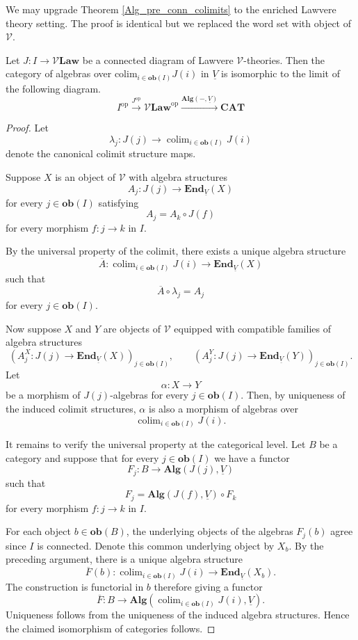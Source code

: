 \documentclass{tac}
\begin{document}
We may upgrade Theorem \ref{Alg_pre_conn_colimits} to the enriched Lawvere theory setting. The proof is identical but we replaced the word set with object of $\mathcal{V}$.

\begin{theorem}
Let $J:I\to\mathcal{V}\mathbf{Law}$ be a connected diagram of Lawvere $\mathcal{V}$-theories. Then the category of algebras over $\text{colim}_{i\in\mathbf{ob}(I)}J(i)$ in $\underline{V}$ is isomorphic to the limit of the following diagram.
\[
I^\text{op}\xrightarrow{J^\text{op}}\mathcal{V}\mathbf{Law}^\text{op}\xrightarrow{\mathbf{Alg}(-,\underline{V})}\mathbf{CAT}
\]
\end{theorem}

\begin{proof}
Let
\[
\lambda_j:J(j)\to\operatorname{colim}_{i\in\mathbf{ob}(I)}J(i)
\]
denote the canonical colimit structure maps.

Suppose $X$ is an object of $\mathcal{V}$ with algebra structures
\[
A_j:J(j)\to\mathbf{End}_{\underline{V}}(X)
\]
for every $j\in\mathbf{ob}(I)$ satisfying
\[
A_j=A_k\circ J(f)
\]
for every morphism $f:j\to k$ in $I$.

By the universal property of the colimit, there exists a unique algebra structure
\[
\overline{A}:
\operatorname{colim}_{i\in\mathbf{ob}(I)}J(i)
\to\mathbf{End}_{\underline{V}}(X)
\]
such that
\[
\overline{A}\circ\lambda_j=A_j
\]
for every $j\in\mathbf{ob}(I)$.

Now suppose $X$ and $Y$ are objects of $\mathcal{V}$ equipped with compatible families of algebra structures
\[
(A^X_j:J(j)\to\mathbf{End}_{\underline{V}}(X))_{j\in\mathbf{ob}(I)},
\qquad
(A^Y_j:J(j)\to\mathbf{End}_{\underline{V}}(Y))_{j\in\mathbf{ob}(I)}.
\]
Let
\[
\alpha:X\to Y
\]
be a morphism of $J(j)$-algebras for every $j\in\mathbf{ob}(I)$. Then, by uniqueness of the induced colimit structures, $\alpha$ is also a morphism of algebras over
\[
\operatorname{colim}_{i\in\mathbf{ob}(I)}J(i).
\]

It remains to verify the universal property at the categorical level. Let $B$ be a category and suppose that for every $j\in\mathbf{ob}(I)$ we have a functor
\[
F_j:B\to\mathbf{Alg}(J(j),\underline{V})
\]
such that
\[
F_j=\mathbf{Alg}(J(f),\underline{V})\circ F_k
\]
for every morphism $f:j\to k$ in $I$.

For each object $b\in\mathbf{ob}(B)$, the underlying objects of the algebras $F_j(b)$ agree since $I$ is connected. Denote this common underlying object by $X_b$. By the preceding argument, there is a unique algebra structure
\[
\overline{F}(b):
\operatorname{colim}_{i\in\mathbf{ob}(I)}J(i)
\to\mathbf{End}_{\underline{V}}(X_b).
\]
The construction is functorial in $b$ therefore giving a functor
\[
\overline{F}:B\to
\mathbf{Alg}
\left(
\operatorname{colim}_{i\in\mathbf{ob}(I)}J(i),\underline{V}
\right).
\]
Uniqueness follows from the uniqueness of the induced algebra structures. Hence the claimed isomorphism of categories follows.
\end{proof}
\end{document}

